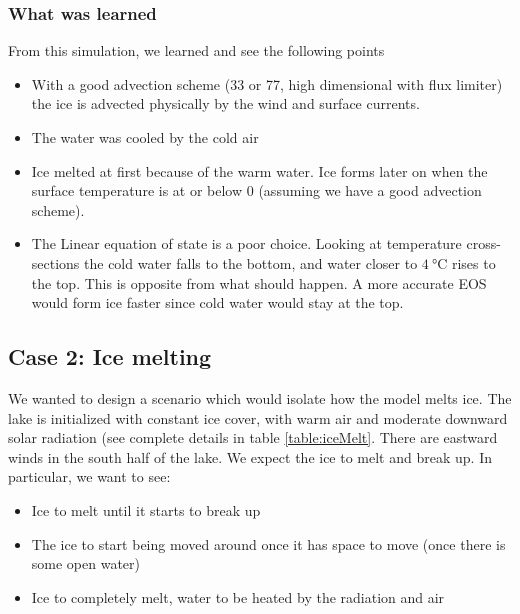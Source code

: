 \documentclass[11pt]{article}
\begin{document}
\subsubsection{What was learned}
From this simulation, we learned and see the following points
\begin{itemize}
\item{With a good advection scheme (33 or 77, high dimensional with flux limiter) the ice is advected physically by the wind and surface currents.}
\item{The water was cooled by the cold air}
\item{Ice melted at first because of the warm water. Ice forms later on when the surface temperature is at or below 0 (assuming we have a good advection scheme).}
\item{The Linear equation of state is a poor choice. Looking at temperature cross-sections the cold water falls to the bottom, and water closer to $\SI{4}{\celsius}$ rises to the top. This is opposite from what should happen. A more accurate EOS would form ice faster since cold water would stay at the top.}
\end{itemize}

\subsection{Case 2: Ice melting}
We wanted to design a scenario which would isolate how the model melts ice. The lake is initialized with constant ice cover, with warm air and moderate downward solar radiation (see complete details in table \ref{table:iceMelt}. There are eastward winds in the south half of the lake. We expect the ice to melt and break up. In particular, we want to see:

\begin{itemize}
\item{Ice to melt until it starts to break up}
\item{The ice to start being moved around once it has space to move (once there is some open water)}
\item{Ice to completely melt, water to be heated by the radiation and air}
\end{itemize}
\end{document}
